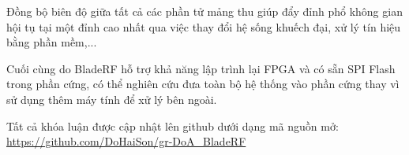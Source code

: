 Đồng bộ biên độ giữa tất cả các phần tử mảng thu giúp đẩy đỉnh phổ không gian hội tụ tại một đỉnh cao nhất qua việc thay đổi hệ sống khuếch đại, xử lý tín hiệu bằng phần mềm,...

Cuối cùng do BladeRF hỗ trợ khả năng lập trình lại FPGA và có sẵn SPI Flash trong phần cứng, có thể nghiên cứu đưa toàn bộ hệ thống vào phần cứng thay vì sử dụng thêm máy tính để xử lý bên ngoài.

Tất cả khóa luận được cập nhật lên github dưới dạng mã nguồn mở: \\
\url{https://github.com/DoHaiSon/gr-DoA_BladeRF}